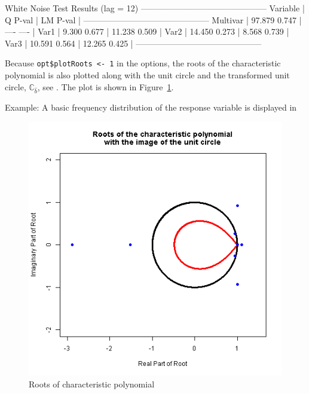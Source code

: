 \documentclass[article]{jss}
\begin{document}
\begin{CodeChunk} 
\begin{CodeOutput}
       White Noise Test Results (lag = 12)
---------------------------------------------
Variable |       Q  P-val |      LM  P-val  |
---------------------------------------------
Multivar |  97.879  0.747 |     ----  ----  |
Var1     |   9.300  0.677 |  11.238  0.509  |
Var2     |  14.450  0.273 |   8.568  0.739  |
Var3     |  10.591  0.564 |  12.265  0.425  |
---------------------------------------------
\end{CodeOutput}
\end{CodeChunk} 

Because \verb|opt$plotRoots <- 1| in the options, 
the roots of the characteristic polynomial is also plotted along with the unit circle and the transformed unit circle, $\mathbb{C}_{\hat{b}}$, see \cite{Johansen2008}. 
The plot is shown in Figure~\ref{fig:Roots}.

Example: A basic frequency distribution of the response variable is displayed in


\begin{figure}[H]
  \centering
  \includegraphics[scale = .6, keepaspectratio=true]{Figures/roots.png}
  \caption{Roots of characteristic polynomial}
  \label{fig:Roots}
\end{figure}
\end{document}

